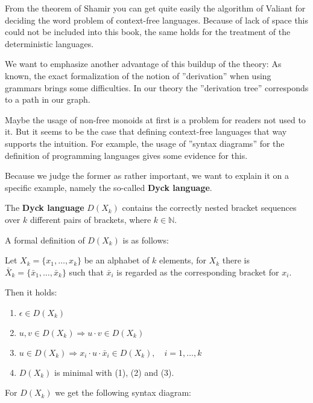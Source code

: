 From the theorem of Shamir you can get quite easily the algorithm of Valiant for
deciding the word problem of context-free languages. Because of lack of space
this could not be included into this book, the same holds for the treatment of
the  deterministic languages.

We want to emphasize another advantage of this buildup of the theory: As
known, the exact formalization of the notion of ''derivation'' when using
grammars brings some difficulties. In our theory the ''derivation tree''
corresponds to a path in our graph.

Maybe the usage of non-free monoids at first is a problem for readers not used to it. 
But it seems to be the case that defining context-free
languages that way supports the intuition. For example, the usage of ''syntax
diagrams'' for the definition of programming languages gives some evidence for
this.

Because we judge the former as rather important, we want to explain it on a
specific example, namely the so-called {\bf Dyck language}.

The {\bf Dyck language} $D(X_k)$ contains the correctly nested bracket sequences
over $k$ different pairs of brackets, where $k \in \mathbb{N}$.

A formal definition of $D(X_k)$ is as follows:

Let $X_k = \{ x_1, \ldots, x_k \}$ be an alphabet of $k$ elements, for $X_k$
there is $\bar{X}_k = \{ \bar{x}_1, \ldots, \bar{x}_k \}$ such that $\bar{x}_i$
is regarded as the corresponding bracket for $x_i$.

Then it holds:

\begin{enumerate}
  \item $\epsilon \in D(X_k)$
  \item $u, v \in D(X_k) \Rightarrow u \cdot v \in D(X_k)$
  \item $u \in D(X_k) \Rightarrow x_i \cdot u \cdot \bar{x}_i \in D(X_k),\quad i
  = 1, \ldots, k$
  \item $D(X_k)$ is minimal with (1), (2) and (3). 
\end{enumerate}

For $D(X_k)$ we get the following syntax diagram:

